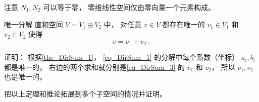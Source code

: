 注意 $N_1, N_2$ 可以等于零， 零维线性空间仅由零向量一个元素构成。

\begin{theorem}{唯一分解}
直和空间 $V = V_1 \oplus V_2$ 中， 对任意 $v \in V$ 都存在唯一的 $v_1 \in V_1$ 和 $v_2 \in V_2$ 使得
\begin{equation}\label{eq_DirSum_3}
v = v_1 + v_2~.
\end{equation}
\end{theorem}
证明： 根据\autoref{the_DirSum_1}， \autoref{eq_DirSum_1} 的分解中每个系数（坐标） $a_i, b_i$ 都是唯一的， 右边的两个求和就分别是\autoref{eq_DirSum_3} 的 $v_1$ 和 $v_2$， 所以 $v_1, v_2$ 也是唯一的。

\begin{exercise}{}
把以上定理和推论拓展到多个子空间的情况并证明。
\end{exercise}


